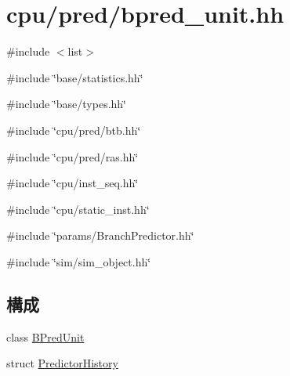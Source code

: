 \hypertarget{bpred__unit_8hh}{
\section{cpu/pred/bpred\_\-unit.hh}
\label{bpred__unit_8hh}
}
{\ttfamily \#include $<$list$>$}\par
{\ttfamily \#include \char`\"{}base/statistics.hh\char`\"{}}\par
{\ttfamily \#include \char`\"{}base/types.hh\char`\"{}}\par
{\ttfamily \#include \char`\"{}cpu/pred/btb.hh\char`\"{}}\par
{\ttfamily \#include \char`\"{}cpu/pred/ras.hh\char`\"{}}\par
{\ttfamily \#include \char`\"{}cpu/inst\_\-seq.hh\char`\"{}}\par
{\ttfamily \#include \char`\"{}cpu/static\_\-inst.hh\char`\"{}}\par
{\ttfamily \#include \char`\"{}params/BranchPredictor.hh\char`\"{}}\par
{\ttfamily \#include \char`\"{}sim/sim\_\-object.hh\char`\"{}}\par
\subsection*{構成}
\begin{DoxyCompactItemize}
\item 
class \hyperlink{classBPredUnit}{BPredUnit}
\item 
struct \hyperlink{structBPredUnit_1_1PredictorHistory}{PredictorHistory}
\end{DoxyCompactItemize}
